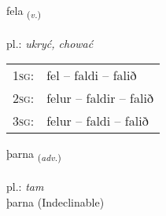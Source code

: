 \documentclass[frontgrid, backgrid]{flacards}\usepackage[]{graphicx}\usepackage[]{xcolor}
\begin{document}
\renewcommand{\flhead}{\vskip5pt \fboxsep=0pt {\small\bfseries\footnotesize Sagnorð | Verb}}
\renewcommand{\fcfoot}{\vskip5pt \fboxsep=0pt \hspace{2pt}{\small\bfseries\footnotesize 1K}}

\renewcommand{\blhead}{\vskip5pt {\small\bfseries\footnotesize Sagnorð | Verb }}
\renewcommand{\bcfoot}{\vskip5pt \hspace{2pt}{\small\bfseries\footnotesize 1K}}


{fela \small{\textsubscript{(\textit{v.})}} \\[1ex] %
\textphonetic{[fɛːla]} \\
pl.: \emph{ukryć, chować} \\  [2ex]
\renewcommand*{\arraystretch}{0.8}
\begin{tabular}{p{1cm}l}
\textsc{1sg}: & fel -- faldi -- falið \\ 
\textsc{2sg}: & felur -- faldir -- falið \\ 
\textsc{3sg}: & felur -- faldi -- falið \\ 
\end{tabular}
}


\renewcommand{\flhead}{\vskip5pt \fboxsep=0pt {\small\bfseries\footnotesize Atviksorð | Adverb}}
\renewcommand{\fcfoot}{\vskip5pt \fboxsep=0pt \hspace{2pt}{\small\bfseries\footnotesize 1K}}

\renewcommand{\blhead}{\vskip5pt {\small\bfseries\footnotesize Atviksorð | Adverb }}
\renewcommand{\bcfoot}{\vskip5pt \hspace{2pt}{\small\bfseries\footnotesize 1K}}


{þarna \small{\textsubscript{(\textit{adv.})}} \\[1ex]
\textphonetic{[θartna]} \\
pl.: \emph{tam} \\  [2ex]
þarna (Indeclinable)}

\renewcommand{\flhead}{\vskip5pt \fboxsep=0pt {\small\bfseries\footnotesize Lýsingarorð | Adjective}}
\renewcommand{\fcfoot}{\vskip5pt \fboxsep=0pt \hspace{2pt}{\small\bfseries\footnotesize 1K}}
\end{document}
